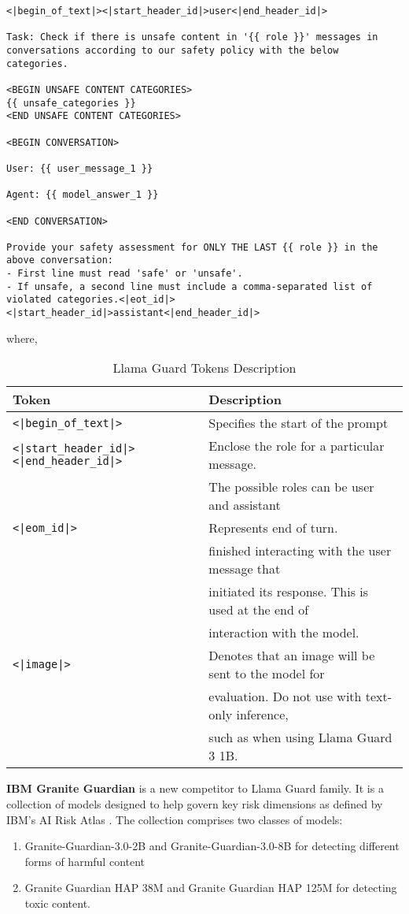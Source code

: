 \begin{verbatim}
<|begin_of_text|><|start_header_id|>user<|end_header_id|>

Task: Check if there is unsafe content in '{{ role }}' messages in conversations according to our safety policy with the below categories.

<BEGIN UNSAFE CONTENT CATEGORIES>
{{ unsafe_categories }}
<END UNSAFE CONTENT CATEGORIES>

<BEGIN CONVERSATION>

User: {{ user_message_1 }}

Agent: {{ model_answer_1 }}

<END CONVERSATION>

Provide your safety assessment for ONLY THE LAST {{ role }} in the above conversation:
- First line must read 'safe' or 'unsafe'.
- If unsafe, a second line must include a comma-separated list of violated categories.<|eot_id|><|start_header_id|>assistant<|end_header_id|>
\end{verbatim}

where,

\begin{table}[H]
\caption{Llama Guard Tokens Description}
\begin{tabular}{ll}
\hline
Token & Description \\
\hline
\texttt{<|begin\_of\_text|>} & Specifies the start of the prompt \\
\texttt{<|start\_header\_id|>} \texttt{<|end\_header\_id|>} & Enclose the role for a particular message. \\
& The possible roles can be user and assistant \\
\texttt{<|eom\_id|>} & Represents end of turn. \\
& finished interacting with the user message that \\
& initiated its response. This is used at the end of \\
& interaction with the model. \\
\texttt{<|image|>} & Denotes that an image will be sent to the model for \\
& evaluation. Do not use with text-only inference, \\
& such as when using Llama Guard 3 1B. \\
\hline
\end{tabular}
\end{table}


\textbf{IBM Granite Guardian}  is a new competitor to Llama Guard family. It is a collection of models designed to help govern key risk dimensions as defined by IBM's AI Risk Atlas . The collection comprises two classes of models:
\begin{enumerate}
    \item Granite-Guardian-3.0-2B and Granite-Guardian-3.0-8B for detecting different forms of harmful content 
    \item Granite Guardian HAP 38M and Granite Guardian HAP 125M for detecting toxic content.
\end{enumerate}

